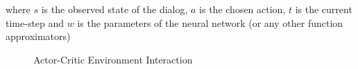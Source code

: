 \documentclass[14pt]{extarticle}
\numberwithin{equation}{section}
\begin{document}
	where $s$ is the observed state of the dialog, $a$ is the chosen action, $t$ is the current time-step and $w$ is the parameters of the neural network (or any other function approximators) 
	\begin{figure}[h]
		\centering
		\setlength{\fboxsep}{5pt}%
		\setlength{\fboxrule}{1pt}%
		\caption{Actor-Critic Environment Interaction
			\label{a2c}}
	\end{figure}
\end{document}
